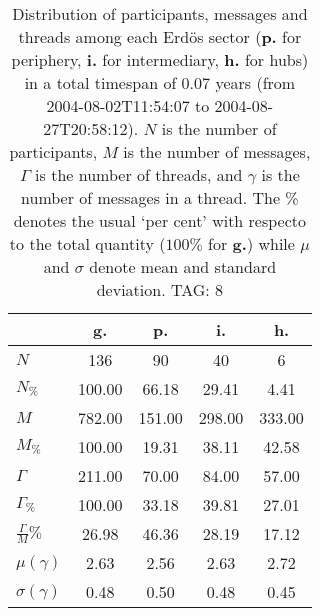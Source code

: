 \begin{table}[h!]
\begin{center}
\begin{tabular}{| l || c | c | c | c |}\hline
 & {\bf g.} & {\bf p.} & {\bf i.} & {\bf h.} \\\hline\hline
$N$ & 136  & 90  & 40  & 6 \\
$N_{\%}$ & 100.00  & 66.18  & 29.41  & 4.41 \\\hline
$M$ & 782.00  & 151.00  & 298.00  & 333.00 \\
$M_{\%}$ & 100.00  & 19.31  & 38.11  & 42.58 \\\hline
$\Gamma$ & 211.00  & 70.00  & 84.00  & 57.00 \\
$\Gamma_{\%}$ & 100.00  & 33.18  & 39.81  & 27.01 \\\hline
$\frac{\Gamma}{M}\%$ & 26.98  & 46.36  & 28.19  & 17.12 \\
$\mu(\gamma)$ & 2.63  & 2.56  & 2.63  & 2.72 \\
$\sigma(\gamma)$ & 0.48  & 0.50  & 0.48  & 0.45 \\\hline
\end{tabular}
\caption{Distribution of participants, messages and threads among each Erd\"os sector ({\bf p.} for periphery, {\bf i.} for intermediary, 
    {\bf h.} for hubs) in a total timespan of 0.07 years (from 2004-08-02T11:54:07 to 2004-08-27T20:58:12). $N$ is the number of participants, $M$ is the number of messages, $\Gamma$ is the number of threads, and $\gamma$ is the number of messages in a thread.
    The \% denotes the usual `per cent' with respecto to the total quantity ($100\%$ for {\bf g.})
    while $\mu$ and $\sigma$ denote mean and standard deviation. TAG: 8}
\end{center}
\end{table}